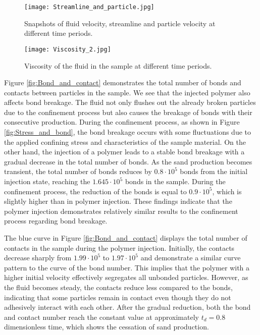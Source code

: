 \documentclass{article}
\begin{document}
\begin{figure}[htbp]
\begin{centering}
\texttt{[image: Streamline\_and\_particle.jpg]}
\par\end{centering}
\caption{Snapshots of fluid velocity, streamline and particle velocity at different time periods.\label{fig:Streamlines}}
\end{figure}

\begin{figure}[htbp]
\begin{centering}
\texttt{[image: Viscosity\_2.jpg]}
\par\end{centering}
\caption{Viscosity of the fluid in the sample at different time periods.\label{fig:visc}}
\end{figure}

Figure \ref{fig:Bond_and_contact} demonstrates the total number of bonds and contacts between particles in the sample. We see that the injected polymer also affects bond breakage. The fluid not only flushes out the already broken particles due to the confinement process but also causes the breakage of bonds with their consecutive production. During the confinement process, as shown in Figure \ref{fig:Stress_and_bond}, the bond breakage occurs with some fluctuations due to the applied confining stress and characteristics of the sample material. On the other hand, the injection of a polymer leads to a stable bond breakage with a gradual decrease in the total number of bonds. As the sand production becomes transient, the total number of bonds reduces by $0.8 \cdot 10^{5} $ bonds from the initial injection state, reaching the $1.645 \cdot 10^{5} $ bonds in the sample. During the confinement process, the reduction of the bonds is equal to $0.9 \cdot 10^{5} $, which is slightly higher than in polymer injection. These findings indicate that the polymer injection demonstrates relatively similar results to the confinement process regarding bond breakage. 

The blue curve in Figure \ref{fig:Bond_and_contact} displays the total number of contacts in the sample during the polymer injection. Initially, the contacts decrease sharply from $1.99 \cdot 10^{5}$ to $1.97 \cdot 10^{5}$ and demonstrate a similar curve pattern to the curve of the bond number. This implies that the polymer with a higher initial velocity effectively segregates all unbonded particles. However, as the fluid becomes steady, the contacts reduce less compared to the bonds, indicating that some particles remain in contact even though they do not adhesively interact with each other. After the gradual reduction, both the bond and contact number reach the constant value at approximately $t_{d} = 0.8$ dimensionless time, which shows the cessation of sand production. 
\end{document}
